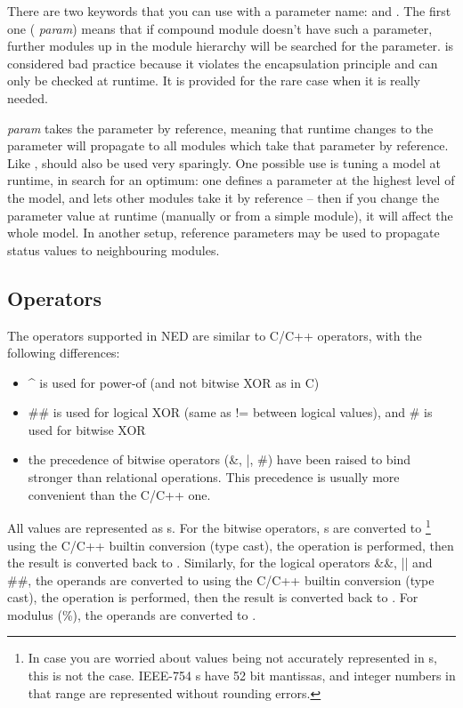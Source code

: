 There are two keywords that you can use with a parameter name:
 and .  The first one ( \textit{param})
means that if compound module doesn't have such a parameter,
further modules up in the module hierarchy will be searched for the parameter.
 is considered bad practice because it violates the encapsulation
principle and can only be checked at runtime. It is provided for the
rare case when it is really needed.

 \textit{param} takes the parameter by reference, meaning that
runtime changes to the parameter will propagate to all modules which
take that parameter by reference. Like , 
should also be used very sparingly. One possible use is tuning a model
at runtime, in search for an optimum: one defines a parameter
at the highest level of the model, and lets other modules take it by reference --
then if you change the parameter value at runtime
(manually or from a simple module), it will affect the whole model.
In another setup, reference parameters may be used to propagate
status values to neighbouring modules.



\subsection{Operators}

The operators supported in NED are similar to C/C++ operators,
with the following differences:

\begin{itemize}
  \item{{\textasciicircum} is used for power-of (and not bitwise XOR as in C)}
  \item{\#\# is used for logical XOR (same as != between logical values), and
        \# is used for bitwise XOR}
  \item{the precedence of bitwise operators (\&, |, \#) have been raised
        to bind stronger than relational operations. This precedence is usually
        more convenient than the C/C++ one.}
\end{itemize}

All values are represented as s. For the bitwise operators,
s are converted to 
  \footnote{In case you are worried about  values being not accurately
  represented in s, this is not the case. IEEE-754 s
  have 52 bit mantissas, and integer numbers in that range are represented
  without rounding errors.}
using the C/C++ builtin conversion (type cast), the operation is performed,
then the result is converted back to .
Similarly, for the logical operators \&\&, || and \#\#,
the operands are converted to  using the C/C++ builtin
conversion (type cast), the operation is performed, then the result
is converted back to . For modulus (\%), the operands are
converted to .

